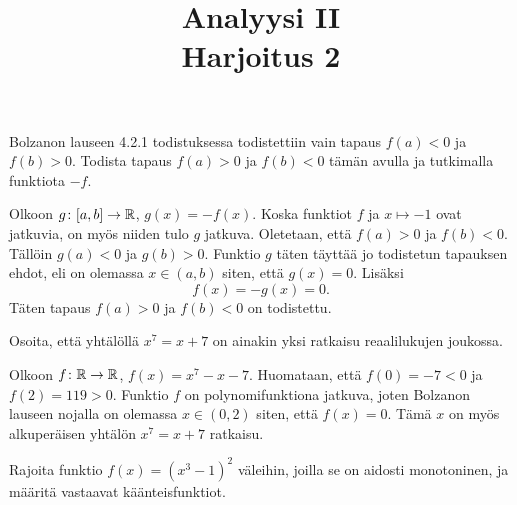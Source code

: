 \documentclass[11pt,a4paper]{amsart}
\title{Analyysi II\\Harjoitus 2}
\author{}
\date{}
\begin{document}

\begin{exercise}
  Bolzanon lauseen 4.2.1 todistuksessa todistettiin vain tapaus
  \(f(a) < 0\) ja \(f(b) > 0\). Todista tapaus \(f(a) > 0\) ja \(f(b) < 0\)
  tämän avulla ja tutkimalla funktiota \(-f\).
\end{exercise}

\begin{solution}
  Olkoon \(g \colon [a, b] \to \mathbb{R}\), \(g(x) = -f(x)\). Koska funktiot \(f\) ja
  \(x \mapsto -1\) ovat jatkuvia, on myös niiden tulo \(g\) jatkuva.
  Oletetaan, että \(f(a) > 0\) ja \(f(b) < 0\). Tällöin \(g(a) < 0\) ja
  \(g(b) > 0\). Funktio \(g\) täten täyttää jo todistetun tapauksen ehdot,
  eli on olemassa \(x \in (a, b)\) siten, että \(g(x) = 0\). Lisäksi
  \[
    f(x) = -g(x) = 0.
  \]
  Täten tapaus \(f(a) > 0\) ja \(f(b) < 0\) on todistettu.

\end{solution}

\begin{exercise}
  Osoita, että yhtälöllä \(x^7 = x + 7\) on ainakin yksi ratkaisu reaalilukujen
  joukossa.
\end{exercise}

\begin{solution}
  Olkoon \(f \colon \mathbb{R} \to \mathbb{R}\), \(f(x) = x^7 - x - 7\). Huomataan, että
  \(f(0) = -7 < 0\) ja \(f(2) = 119 > 0\). Funktio \(f\) on polynomifunktiona
  jatkuva, joten Bolzanon lauseen nojalla on olemassa \(x \in (0, 2)\)
  siten, että \(f(x) = 0\). Tämä \(x\) on myös alkuperäisen yhtälön
  \(x^7 = x + 7\) ratkaisu.
\end{solution}

\begin{exercise}
  Rajoita funktio \(f(x) = (x^3 - 1)^2\) väleihin, joilla se on aidosti
  monotoninen, ja määritä vastaavat käänteisfunktiot.
\end{exercise}
\end{document}
